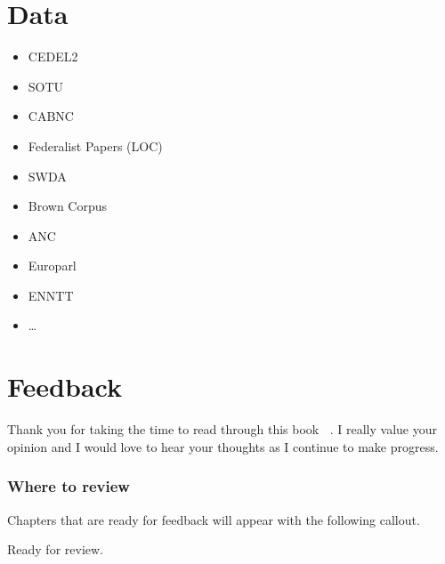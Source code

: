\documentclass[
  letterpaper,
  DIV=11,
  numbers=noendperiod]{scrreport}
\providecommand{\tightlist}{%
  \setlength{\itemsep}{0pt}\setlength{\parskip}{0pt}}\usepackage{longtable,booktabs,array}
\theoremstyle{definition}
\theoremstyle{remark}
\begin{document}
\cleardoublepage
{}
{}
\appendix

\hypertarget{data-appendix}{%
\chapter{Data}\label{data-appendix}}

\begin{itemize}
\tightlist
\item
  CEDEL2
\item
  SOTU
\item
  CABNC
\item
  Federalist Papers (LOC)
\item
  SWDA
\item
  Brown Corpus
\item
  ANC
\item
  Europarl
\item
  ENNTT
\item
  \ldots{}
\end{itemize}

\hypertarget{feedback-appendix}{%
\chapter{\texorpdfstring{Feedback
}{Feedback }}\label{feedback-appendix}}

Thank you for taking the time to read through this book 🫶🏻. I really
value your opinion and I would love to hear your thoughts as I continue
to make progress.

\hypertarget{where-to-review}{%
\subsection*{Where to review}\label{where-to-review}}

Chapters that are ready for feedback will appear with the following
callout.

\begin{tcolorbox}[enhanced jigsaw, title=\textcolor{quarto-callout-tip-color}{\faLightbulb}\hspace{0.5em}{Draft}, left=2mm, breakable, toptitle=1mm, colback=white, leftrule=.75mm, toprule=.15mm, coltitle=black, colframe=quarto-callout-tip-color-frame, colbacktitle=quarto-callout-tip-color!10!white, bottomtitle=1mm, opacityback=0, titlerule=0mm, rightrule=.15mm, opacitybacktitle=0.6, bottomrule=.15mm, arc=.35mm]

Ready for review.

\end{tcolorbox}
\end{document}
